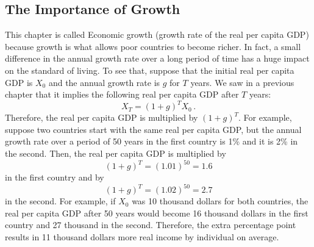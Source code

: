 \documentclass[letterpaper]{article}\usepackage[]{graphicx}\usepackage[]{color}
\numberwithin{exer}{section}
\theoremstyle{nonumberplain}
\begin{document}
\subsection{The Importance of Growth}

This chapter is called Economic growth (growth rate of the real per
capita GDP) because growth is what allows poor countries to become
richer. In fact, a small difference in the annual growth rate over a
long period of time has a huge impact on the standard of living. To
see that, suppose that the initial real per capita GDP is $X_0$ and
the annual growth rate is $g$ for $T$ years. We saw in a previous
chapter that it implies the following real per capita GDP after $T$
years:
\[
X_T = (1+g)^T X_0\,.
\]
Therefore, the real per capita GDP is multiplied by $(1+g)^T$. For
example, suppose two countries start with the same real per capita
GDP, but the annual growth rate over a period of 50 years in the first
country is 1\% and it is 2\% in the second. Then, the real per capita
GDP is multiplied by
\[
(1+g)^T = (1.01)^{50} = 1.6
\]
in the first country and by 
\[
(1+g)^T = (1.02)^{50} = 2.7
\]
in the second. For example, if $X_0$ was 10 thousand dollars for both
countries, the real per capita GDP after 50 years would become
16 thousand dollars in the first country and
27 thousand in the second. Therefore, the
extra percentage point results in 
11 thousand dollars
more real income by individual on average. 
\end{document}
